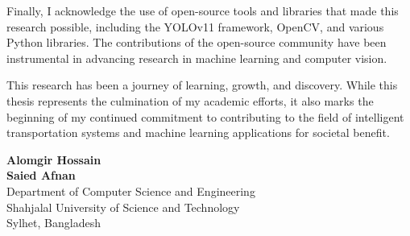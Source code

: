 Finally, I acknowledge the use of open-source tools and libraries that made this research possible, including the YOLOv11 framework, OpenCV, and various Python libraries. The contributions of the open-source community have been instrumental in advancing research in machine learning and computer vision.

This research has been a journey of learning, growth, and discovery. While this thesis represents the culmination of my academic efforts, it also marks the beginning of my continued commitment to contributing to the field of intelligent transportation systems and machine learning applications for societal benefit.

\textbf{Alomgir Hossain}\\
\textbf{Saied Afnan}\\
Department of Computer Science and Engineering\\
Shahjalal University of Science and Technology\\
Sylhet, Bangladesh

\newpage 